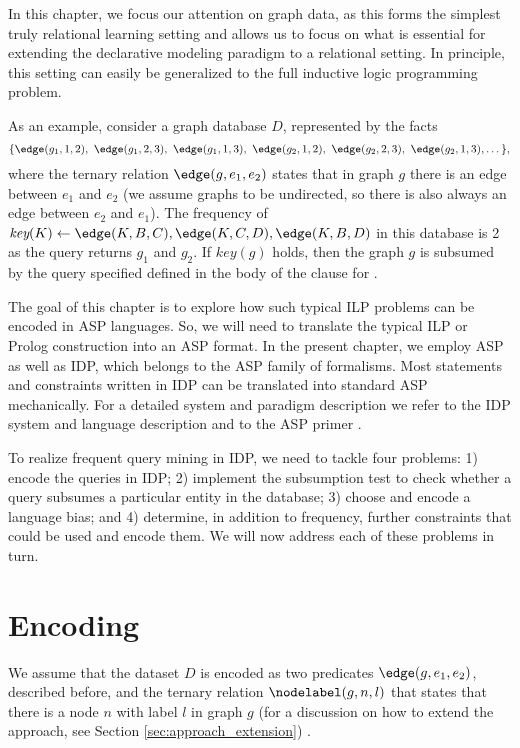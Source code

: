 In this chapter, we focus our attention on graph data, as this forms the simplest truly relational learning setting and allows us to focus on what is essential for extending the declarative modeling paradigm to a relational setting. In principle, this setting can easily be generalized to the full inductive logic programming problem. 
 
As an example, consider a graph database $D$, represented by the facts 
\begin{equation*}
\{ \edge(g_1,1,2),~ \edge(g_1,2,3),~ \edge(g_1,1,3),~ \edge(g_2,1,2),~ \edge(g_2,2,3),~ \edge(g_2,1,3), \dots \},
\end{equation*}
where the ternary relation $\edge(g,e_1,e_2)$ states that in graph $g$ there is an edge between $e_1$ and $e_2$ (we assume graphs to be undirected, so there is also always an edge between $e_2$ and $e_1$). The frequency of $\textit{key}(K) \leftarrow \edge(K,B,C), \edge(K,C,D), \edge(K,B,D)$ in this database is 2 as the query returns $g_1$ and $g_2$. If $key(g)$ holds,  then the graph $g$ is subsumed by the query specified defined in the body of the clause for \keypred.

The goal of this chapter is to explore how such typical ILP problems can be encoded in 
ASP languages.   So, we will need to translate the typical ILP or Prolog construction into an ASP format. 
In the present chapter, we employ ASP as well as IDP, which belongs to the ASP family of formalisms. Most statements and constraints written in IDP can be translated into standard ASP mechanically. %
For a detailed system and paradigm description we refer to the IDP system and language description \parencite{idp} and to the ASP primer \parencite{eiter}.

To realize frequent query mining in IDP, we need to tackle four problems: 1) encode the queries in IDP; 2) implement the subsumption test to check whether a query subsumes a particular entity in the database; 3) choose and encode a language bias; and 4) determine, in addition to frequency, further constraints that could be used and encode them. We will now address each of these problems in turn.

\section{Encoding}\label{sec:encoding}
We assume that the dataset $D$ is encoded as two predicates $\edge(g,e_1,e_2)$, described before, and the ternary relation $\nodelabel(g,n,l)$ that states that there is a node $n$ with label $l$ in graph $g$ (for a discussion on how to extend the approach, see Section \ref{sec:approach_extension}) . 

